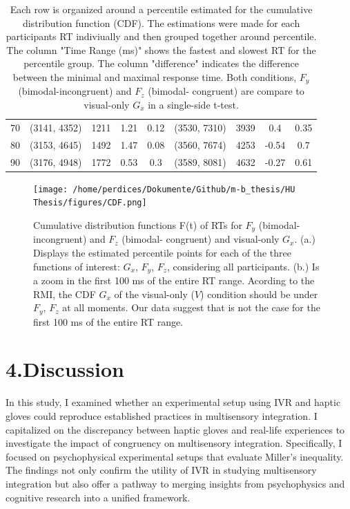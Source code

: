 \documentclass[12pt,oneside,openright]{report}
\begin{document}
\begin{table}[!ht]
{\begin{tabular}{ccccccccc}
    70 & (3141, 4352) & 1211 & 1.21 & 0.12 & (3530, 7310) & 3939 & 0.4 & 0.35 \\
    80 & (3153, 4645) & 1492 & 1.47 & 0.08 & (3560, 7674) & 4253 & -0.54 & 0.7 \\
    90 & (3176, 4948) & 1772 & 0.53 & 0.3 & (3589, 8081) & 4632 & -0.27 & 0.61 \\ \hline
    \end{tabular}}
    \caption{Each row is organized around a percentile estimated for the cumulative distribution function (CDF). The estimations were made for each participants RT indiviually and then grouped together around percentile. The column "Time Range (ms)" shows the fastest and slowest RT for the percentile group. The column "difference" indicates the difference between the minimal and maximal response time. Both conditions, $F_y$ (bimodal-incongruent) and $F_z$ (bimodal- congruent) are compare to visual-only $G_x$ in a single-side t-test.}
    \label{tab:response-time-range}
\end{table}


\begin{figure}[!ht]
    \centering
    \texttt{[image: /home/perdices/Dokumente/Github/m-b\_thesis/HU Thesis/figures/CDF.png]}
    \caption{ Cumulative distribution functions F(t) of RTs for $F_y$ (bimodal-incongruent) and $F_z$ (bimodal- congruent) and visual-only $G_x$. (a.) Displays the estimated percentile points for each of the three functions of interest: $G_x$, $F_y$, $F_z$, considering all participants. 
    (b.) Is a zoom in the first 100 ms of the entire RT range. Acording to the RMI, the CDF $G_x$ of the visual-only ($V$) condition should be under $F_y$, $F_z$ at all moments. Our data suggest that is not the case for the first 100 ms of the entire RT range.}
    \label{fig:CDF}
\end{figure}


\section*{4.Discussion}

In this study, I examined whether an experimental setup using IVR and haptic gloves could reproduce established practices in multisensory integration. I capitalized on the discrepancy between haptic gloves and real-life experiences to investigate the impact of congruency on multisensory integration. Specifically, I focused on psychophysical experimental setups that evaluate Miller's inequality. The findings not only confirm the utility of IVR in studying multisensory integration but also offer a pathway to merging insights from psychophysics and cognitive research into a unified framework. 
\end{document}
